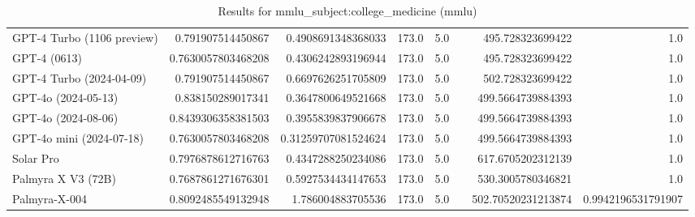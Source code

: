 \begin{table}[htp]
{\begin{tabular}{lrrrrrrr}
GPT-4 Turbo (1106 preview) & 0.791907514450867 & 0.4908691348368033 & 173.0 & 5.0 &  & 495.728323699422 & 1.0 \\
GPT-4 (0613) & 0.7630057803468208 & 0.4306242893196944 & 173.0 & 5.0 &  & 495.728323699422 & 1.0 \\
GPT-4 Turbo (2024-04-09) & 0.791907514450867 & 0.6697626251705809 & 173.0 & 5.0 &  & 502.728323699422 & 1.0 \\
GPT-4o (2024-05-13) & 0.838150289017341 & 0.3647800649521668 & 173.0 & 5.0 &  & 499.5664739884393 & 1.0 \\
GPT-4o (2024-08-06) & 0.8439306358381503 & 0.3955839837906678 & 173.0 & 5.0 &  & 499.5664739884393 & 1.0 \\
GPT-4o mini (2024-07-18) & 0.7630057803468208 & 0.31259707081524624 & 173.0 & 5.0 &  & 499.5664739884393 & 1.0 \\
Solar Pro & 0.7976878612716763 & 0.4347288250234086 & 173.0 & 5.0 &  & 617.6705202312139 & 1.0 \\
Palmyra X V3 (72B) & 0.7687861271676301 & 0.5927534434147653 & 173.0 & 5.0 &  & 530.3005780346821 & 1.0 \\
Palmyra-X-004 & 0.8092485549132948 & 1.786004883705536 & 173.0 & 5.0 &  & 502.70520231213874 & 0.9942196531791907 \\
\bottomrule
\end{tabular}}
\caption{Results for mmlu_subject:college_medicine (mmlu)}
\label{fig:mmlu_subject:college_medicine (mmlu)}
\end{table}